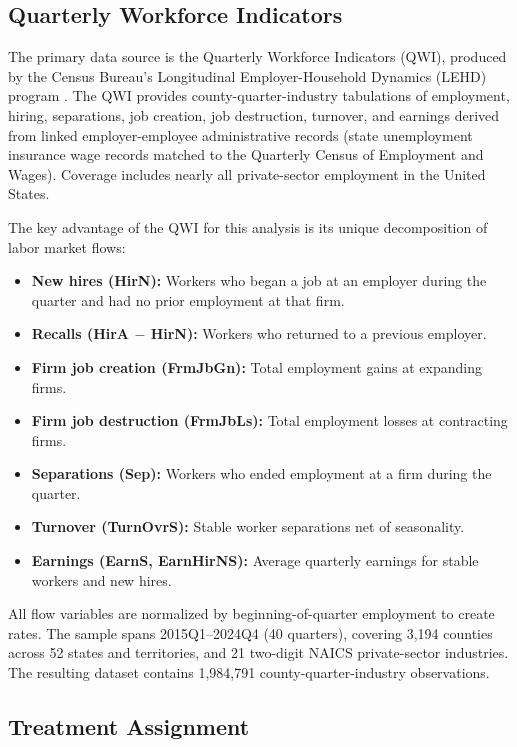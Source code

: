 \documentclass[12pt]{article}
\begin{document}
\subsection{Quarterly Workforce Indicators}

The primary data source is the Quarterly Workforce Indicators (QWI), produced by the Census Bureau's Longitudinal Employer-Household Dynamics (LEHD) program \citep{abowd2009qwi}. The QWI provides county-quarter-industry tabulations of employment, hiring, separations, job creation, job destruction, turnover, and earnings derived from linked employer-employee administrative records (state unemployment insurance wage records matched to the Quarterly Census of Employment and Wages). Coverage includes nearly all private-sector employment in the United States.

The key advantage of the QWI for this analysis is its unique decomposition of labor market flows:

\begin{itemize}
\item \textbf{New hires (HirN):} Workers who began a job at an employer during the quarter and had no prior employment at that firm.
\item \textbf{Recalls (HirA $-$ HirN):} Workers who returned to a previous employer.
\item \textbf{Firm job creation (FrmJbGn):} Total employment gains at expanding firms.
\item \textbf{Firm job destruction (FrmJbLs):} Total employment losses at contracting firms.
\item \textbf{Separations (Sep):} Workers who ended employment at a firm during the quarter.
\item \textbf{Turnover (TurnOvrS):} Stable worker separations net of seasonality.
\item \textbf{Earnings (EarnS, EarnHirNS):} Average quarterly earnings for stable workers and new hires.
\end{itemize}

All flow variables are normalized by beginning-of-quarter employment to create rates. The sample spans 2015Q1--2024Q4 (40 quarters), covering 3,194 counties across 52 states and territories, and 21 two-digit NAICS private-sector industries. The resulting dataset contains 1,984,791 county-quarter-industry observations.

\subsection{Treatment Assignment}
\end{document}
